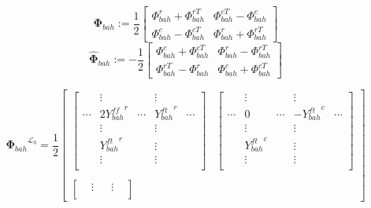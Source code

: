 \documentclass{article}
\begin{document}
\[
    \mathbf{\Phi}_{bah} := 
    \frac{1}{2}
    \begin{bmatrix}
        \Phi_{bah}^r + \Phi_{bah}^{rT} & \Phi_{bah}^{cT} - \Phi_{bah}^{c}\\
        \Phi_{bah}^{c} - \Phi_{bah}^{cT} & \Phi_{bah}^r + \Phi_{bah}^{rT}
    \end{bmatrix}
\]
\[
    \mathbf{\hat{\Phi}}_{bah} := 
    -\frac{1}{2}
    \begin{bmatrix}
        \Phi_{bah}^c + \Phi_{bah}^{cT} & \Phi_{bah}^{r} - \Phi_{bah}^{rT}\\
        \Phi_{bah}^{rT} - \Phi_{bah}^{r} & \Phi_{bah}^c + \Phi_{bah}^{cT}
    \end{bmatrix}
\]

\[
    {\mathbf{\Phi}_{bah}}^{\mathcal{L}_0} =
    \frac{1}{2}
    \begin{bmatrix}
    \begin{bmatrix}
                & \vdots              &        & \vdots           &              \\
        \cdots  & 2 {Y^{ff}_{bah}}^r  & \cdots & {Y^{ft}_{bah}}^r & \cdots       \\
                & \vdots              &        & \vdots           &              \\
                & {Y^{ft}_{bah}}^r    &        & \vdots           &              \\
                & \vdots              &        & \vdots           &              \\
    \end{bmatrix} &
    \begin{bmatrix}
                & \vdots            &        & \vdots               &              \\
        \cdots  & 0                 & \cdots & -{Y^{ft}_{bah}}^c    & \cdots\\
                & \vdots            &        & \vdots               &              \\
                & {Y^{ft}_{bah}}^c  &        & \vdots               &              \\
                & \vdots            &        & \vdots               &              \\
    \end{bmatrix} \\ \\
    \begin{bmatrix}
                & \vdots            &        & \vdots               &              \\

\end{bmatrix}
\end{bmatrix}\]
\end{document}
